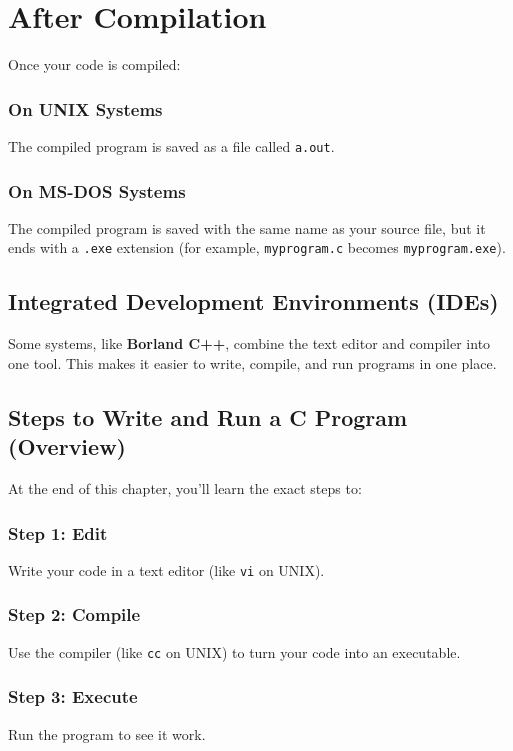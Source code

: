 \documentclass{article}
\begin{document}
\section{After Compilation}

Once your code is compiled:
\subsubsection{On UNIX Systems}
The compiled program is saved as a file called \texttt{a.out}.

\subsubsection{On MS-DOS Systems}
The compiled program is saved with the same name as your source file, but it ends with a \texttt{.exe} extension (for example, \texttt{myprogram.c} becomes \texttt{myprogram.exe}).

\subsection{Integrated Development Environments (IDEs)}

Some systems, like \textbf{Borland C++}, combine the text editor and compiler into one tool. This makes it easier to write, compile, and run programs in one place.

\subsection{Steps to Write and Run a C Program (Overview)}

At the end of this chapter, you'll learn the exact steps to:

\subsubsection{Step 1: Edit}
Write your code in a text editor (like \texttt{vi} on UNIX).

\subsubsection{Step 2: Compile}
Use the compiler (like \texttt{cc} on UNIX) to turn your code into an executable.

\subsubsection{Step 3: Execute}
Run the program to see it work.
\end{document}
